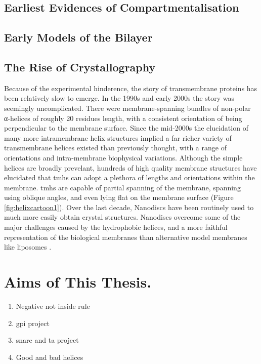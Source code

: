 \subsection{Earliest Evidences of Compartmentalisation}


\subsection{Early Models of the Bilayer}

\subsection{The Rise of Crystallography}

Because of the experimental hinderence, the story of transmembrane proteins has been relatively slow to emerge. In the 1990s and early 2000s the story was seemingly uncomplicated. There were membrane-spanning bundles of non-polar α-helices of roughly 20 residues length, with a consistent orientation of being perpendicular to the membrane surface. Since the mid-2000s the elucidation of many more intramembrane helix structures implied a far richer variety of transmembrane helices existed than previously thought, with a range of orientations and intra-membrane biophysical variations. Although the simple helices are broadly prevelant, hundreds of high quality membrane structures have elucidated that \gls{tmh}s can adopt a plethora of lengths and orientations within the membrane. \gls{tmh}s are capable of partial spanning of the membrane, spanning using oblique angles, and even lying flat on the membrane surface \cite{VonHeijne2006, Elofsson2007} (Figure \ref{fig:helixcartoon1}). Over the last decade, Nanodiscs have been routinely used to much more easily obtain crystal structures. Nanodiscs overcome some of the major challenges caused by the hydrophobic helices, and a more faithful representation of the biological membranes than alternative model membranes like liposomes \cite{Borch2009}. %


\section{Aims of This Thesis.}

\begin{enumerate}
  \item Negative not inside rule
  \item \gls{gpi} project
  \item \gls{snare} and \gls{ta} project
  \item Good and bad helices
\end{enumerate}
